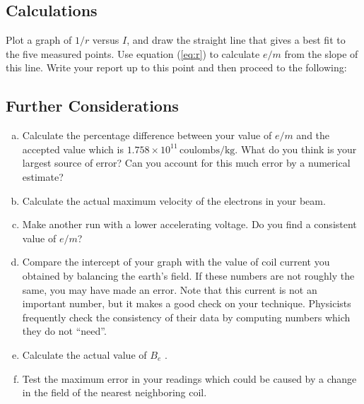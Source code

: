\subsection{Calculations}
Plot a graph of $1/r$ versus $I$, and draw the straight line that gives a best fit to the five measured points. Use equation ({\ref{eq:r}}) to calculate $e/m$ from the slope of this line. Write your report up to this point and then proceed to the following:

\subsection{Further Considerations}
\begin{enumerate}[(a)]
\item Calculate the percentage difference between your value of $e/m$ and the accepted value which is $1.758 \times 10^{11}\, \mathrm{coulombs} / \mathrm{kg}$. What do you think is your largest source of error? Can you account for this much error by a numerical estimate?
\item Calculate the actual maximum velocity of the electrons in your beam.
\item Make another run with a lower accelerating voltage. Do you find a consistent value of $e/m$?
\item Compare the intercept of your graph with the value of coil current you obtained by balancing the earth's field. If these numbers are not roughly the same, you may have made an error. Note that this current is not an important number, but it makes a good check on your technique. Physicists frequently check the consistency of their data by computing numbers which they do not ``need''.
\item Calculate the actual value of $B_e$ .
\item Test the maximum error in your readings which could be caused by a change in the field of the nearest neighboring coil.
\end{enumerate}
